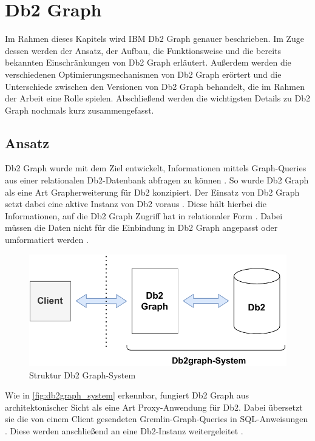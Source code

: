 \section{Db2 Graph}
\label{db2graph}

Im Rahmen dieses Kapitels wird IBM Db2 Graph genauer beschrieben. Im Zuge dessen werden der Ansatz, der Aufbau, die Funktionsweise und die bereits bekannten Einschränkungen von Db2 Graph erläutert. Außerdem werden die verschiedenen Optimierungsmechanismen von Db2 Graph erörtert und die Unterschiede zwischen den Versionen von Db2 Graph behandelt, die im Rahmen der Arbeit eine Rolle spielen. Abschließend werden die wichtigsten Details zu Db2 Graph nochmals kurz zusammengefasst.

\subsection{Ansatz}
\label{db2graph:ansatz}
Db2 Graph wurde mit dem Ziel entwickelt, Informationen mittels Graph-Queries aus einer relationalen Db2-Datenbank abfragen zu können \cite{vldb_tian, sigmod_tian}. So wurde Db2 Graph als eine Art Grapherweiterung für Db2 konzipiert. Der Einsatz von Db2 Graph setzt dabei eine aktive Instanz von Db2 voraus \cite{vldb_tian, sigmod_tian}. Diese hält hierbei die Informationen, auf die Db2 Graph Zugriff hat in relationaler Form \cite{vldb_tian, sigmod_tian}. Dabei müssen die Daten nicht für die Einbindung in Db2 Graph angepasst oder umformatiert werden \cite{vldb_tian, sigmod_tian}.

\begin{figure}[ht]
    \centering
    \includegraphics[width=\textwidth]{images/db2graph_system.pdf}
    \vspace{0.1em}
    \caption{Struktur Db2 Graph-System}
    \label{fig:db2graph_system}
\end{figure}

Wie in \autoref{fig:db2graph_system} erkennbar, fungiert Db2 Graph aus architektonischer Sicht als eine Art Proxy-Anwendung für Db2. Dabei übersetzt sie die von einem Client gesendeten Gremlin-Graph-Queries in SQL-An\-wei\-sung\-en \cite{vldb_tian, sigmod_tian}. Diese werden anschließend an eine Db2-Instanz weitergeleitet \cite{vldb_tian, sigmod_tian}. 

